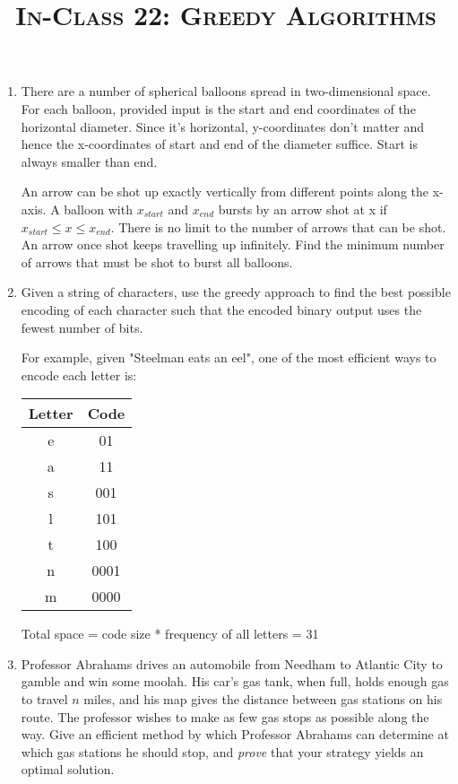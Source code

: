 \documentclass{article}
\title{\large{\textsc{In-Class 22: Greedy Algorithms}}}
\date{}
\begin{document}
\maketitle


\begin{enumerate}

\item There are a number of spherical balloons spread in two-dimensional space. For each balloon, provided input is the start and end coordinates of the horizontal diameter. Since it's horizontal, y-coordinates don't matter and hence the x-coordinates of start and end of the diameter suffice. Start is always smaller than end.

An arrow can be shot up exactly vertically from different points along the x-axis. A balloon with $x_{start}$ and $x_{end}$ bursts by an arrow shot at x if $x_{start} \leq x \leq x_{end}$. There is no limit to the number of arrows that can be shot. An arrow once shot keeps travelling up infinitely. Find the minimum number of arrows that must be shot to burst all balloons.

\item Given a string of characters, use the greedy approach to find the best possible encoding of each character such that the encoded binary output uses the fewest number of bits.

For example, given "Steelman eats an eel", one of the most efficient ways to encode each letter is:
\begin{center}
 \begin{tabular}{||c c||}
 \hline
 Letter & Code  \\ [0.5ex]
 \hline\hline
 e & 01  \\
 \hline
 a & 11  \\
 \hline
 s & 001 \\
 \hline
 l & 101 \\
  \hline
 t & 100 \\
  \hline
 n & 0001 \\
 \hline
 m & 0000\\ [1ex]
 \hline

\end{tabular}
\end{center}
 Total space = code size * frequency of all letters = 31

\item Professor Abrahams drives an automobile from Needham to Atlantic City to gamble and win some moolah. His car's gas tank, when full, holds enough gas to travel $n$ miles, and his map gives the distance between gas stations on his route. The professor wishes to make as few gas stops as possible along the way. Give an efficient method by which Professor Abrahams can determine at which gas stations he should stop, and \textit{prove} that your strategy yields an optimal solution.


\end{enumerate}
\end{document}
